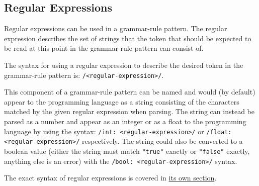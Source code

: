 
\subsection{Regular Expressions}
{
	Regular expressions can be used in a grammar-rule pattern.
	The regular expression describes the set of strings that the token
	that should be
	expected
	to be read at this point in the grammar-rule pattern can consist of.
	
	The syntax for using a regular expression to describe the desired token
	in the grammar-rule pattern is: \texttt{/<regular-expression>/}.
	
	This component of a grammar-rule pattern can be named and would (by default)
	appear to
	the programming language as a string consisting of the characters matched
	by the given regular expression when parsing.
	The string can instead be
	parsed as a number and appear
	as an integer or as a float to the programming language
	by using the syntax:
	\texttt{/int: <regular-expression>/} or
	\texttt{/float: <regular-expression>/} respectively.
	The string could also be converted to a boolean value (either the string
	must match \texttt{"true"} exactly or \texttt{"false"} exactly,
	anything else is an error)
	with the \texttt{/bool: <regular-expression>/} syntax.
	
	The exact syntax of regular expressions is covered in
	\hyperref[sec:regex]{its own section}.
}
